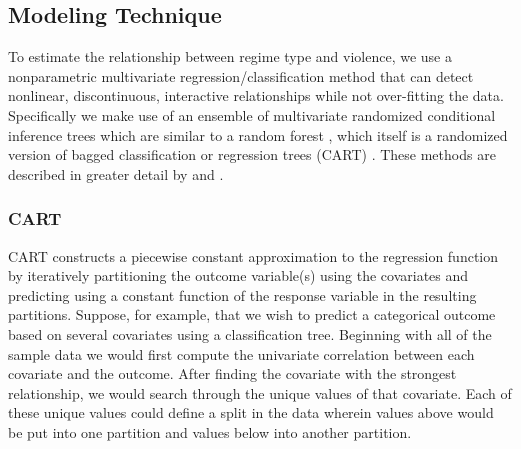 \documentclass[titlepage, onecolumn,12pt]{article}
\begin{document}

\subsection{Modeling Technique}

To estimate the relationship between regime type and violence, we use a nonparametric multivariate regression/classification method that can detect nonlinear, discontinuous, interactive relationships while not over-fitting the data. Specifically we make use of an ensemble of multivariate randomized conditional inference trees \citep{hothorn2006unbiased} which are similar to a random forest \citep{breiman2001random}, which itself is a randomized version of bagged classification or regression trees (CART) \citep{breiman1999classification,breiman1996bagging}. These methods are described in greater detail by \citet{jones2015rfss} and \citet{friedman2001elements}.

\subsubsection{CART}

CART constructs a piecewise constant approximation to the regression function by iteratively partitioning the outcome variable(s) using the covariates and predicting using a constant function of the response variable in the resulting partitions.  Suppose, for example, that we wish to predict a categorical outcome based on several covariates using a classification tree. Beginning with all of the sample data we would first compute the univariate correlation between each covariate and the outcome. After finding the covariate with the strongest relationship, we would search through the unique values of that covariate. Each of these unique values could define a split in the data wherein values above would be put into one partition and values below into another partition.
\end{document}
